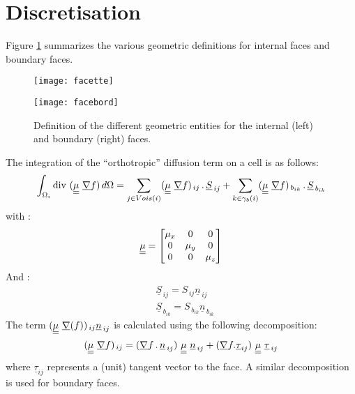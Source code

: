 \section*{Discretisation} \label{Base_Visort_paragraphe2}

Figure \ref{Base_Visort_fig_geom} summarizes the various geometric definitions
for internal faces and boundary faces. \begin{figure}[h]
\parbox{8cm}{%
\centerline{\texttt{[image: facette]}}}
\parbox{8cm}{%
\centerline{\texttt{[image: facebord]}}}
\caption{\label{Base_Visort_fig_geom}Definition of the different geometric entities for the internal (left) and boundary (right) faces.}
\end{figure}
The integration of the ``orthotropic'' diffusion term on a cell is as follows:
\begin{equation}
\int_{\Omega_i}\text{div}\, \,(\underline{\underline{\mu}}\ \underline{\nabla} f)\,d\Omega =\sum\limits_{j \in
Vois(i)}( \underline{\underline{\mu}}\ \underline{\nabla} f)_{\,ij}\,.\,\underline{S}_{\,ij} + \sum\limits_{k \in
\gamma_b(i)}( \underline{\underline{\mu}}\ \underline{\nabla} f)_{\,b_{ik}}\,.\,\underline{S}_{\,b_{ik}}
\end{equation}
with :
\begin{equation}
\underline{\underline{\mu}}=\begin{bmatrix}\mu_x & 0 & 0 \\ 0 & \mu_y & 0 \\ 0 & 0 & \mu_z \end{bmatrix}
\end{equation}
And :
\begin{equation}
\begin{array}{ll}
&\underline{S}_{\,ij} = S_{\,ij} \underline{n}_{\,ij} \\
&\underline{S}_{\,b_{ik}} = S_{\,b_{ik}} \underline{n}_{\,b_{ik}}
\end{array}
\end{equation}
The term $(\tens{\mu}\ \grad(f))_{\,ij}\underline{n}_{\,ij}$ is calculated using the following decomposition:
\begin{equation}
(\tens{\mu}\ \grad f)_{\,ij} = (\grad f \,.\,\underline{n}_{\,ij})\ \tens{\mu}\
\underline{n}_{\,ij}+
(\grad f .\underline{\tau}_{ij})\ \tens{\mu}\ \underline{\tau}_{\,ij}
\end{equation}
where $\underline{\tau}_{ij}$ represents a (unit) tangent vector to the face. A similar decomposition is used for boundary faces.
